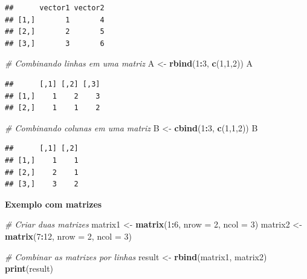 \documentclass[
]{book}
\newenvironment{Shaded}{\begin{snugshade}}{\end{snugshade}}
\newcommand{\AttributeTok}[1]{\textcolor[rgb]{0.13,0.29,0.53}{#1}}
\newcommand{\CommentTok}[1]{\textcolor[rgb]{0.56,0.35,0.01}{\textit{#1}}}
\newcommand{\DecValTok}[1]{\textcolor[rgb]{0.00,0.00,0.81}{#1}}
\newcommand{\FunctionTok}[1]{\textcolor[rgb]{0.13,0.29,0.53}{\textbf{#1}}}
\newcommand{\NormalTok}[1]{#1}
\newcommand{\OtherTok}[1]{\textcolor[rgb]{0.56,0.35,0.01}{#1}}
\newcommand{\SpecialCharTok}[1]{\textcolor[rgb]{0.81,0.36,0.00}{\textbf{#1}}}
\begin{document}
\begin{verbatim}
##      vector1 vector2
## [1,]       1       4
## [2,]       2       5
## [3,]       3       6
\end{verbatim}

\begin{Shaded}
\begin{Highlighting}[]
\CommentTok{\# Combinando linhas em uma matriz}
\NormalTok{A }\OtherTok{\textless{}{-}} \FunctionTok{rbind}\NormalTok{(}\DecValTok{1}\SpecialCharTok{:}\DecValTok{3}\NormalTok{, }\FunctionTok{c}\NormalTok{(}\DecValTok{1}\NormalTok{,}\DecValTok{1}\NormalTok{,}\DecValTok{2}\NormalTok{))}
\NormalTok{A}
\end{Highlighting}
\end{Shaded}

\begin{verbatim}
##      [,1] [,2] [,3]
## [1,]    1    2    3
## [2,]    1    1    2
\end{verbatim}

\begin{Shaded}
\begin{Highlighting}[]
\CommentTok{\# Combinando colunas em uma matriz}
\NormalTok{B }\OtherTok{\textless{}{-}} \FunctionTok{cbind}\NormalTok{(}\DecValTok{1}\SpecialCharTok{:}\DecValTok{3}\NormalTok{, }\FunctionTok{c}\NormalTok{(}\DecValTok{1}\NormalTok{,}\DecValTok{1}\NormalTok{,}\DecValTok{2}\NormalTok{))}
\NormalTok{B}
\end{Highlighting}
\end{Shaded}

\begin{verbatim}
##      [,1] [,2]
## [1,]    1    1
## [2,]    2    1
## [3,]    3    2
\end{verbatim}

\textbf{Exemplo com matrizes}

\begin{Shaded}
\begin{Highlighting}[]
\CommentTok{\# Criar duas matrizes}
\NormalTok{matrix1 }\OtherTok{\textless{}{-}} \FunctionTok{matrix}\NormalTok{(}\DecValTok{1}\SpecialCharTok{:}\DecValTok{6}\NormalTok{, }\AttributeTok{nrow =} \DecValTok{2}\NormalTok{, }\AttributeTok{ncol =} \DecValTok{3}\NormalTok{)}
\NormalTok{matrix2 }\OtherTok{\textless{}{-}} \FunctionTok{matrix}\NormalTok{(}\DecValTok{7}\SpecialCharTok{:}\DecValTok{12}\NormalTok{, }\AttributeTok{nrow =} \DecValTok{2}\NormalTok{, }\AttributeTok{ncol =} \DecValTok{3}\NormalTok{)}

\CommentTok{\# Combinar as matrizes por linhas}
\NormalTok{result }\OtherTok{\textless{}{-}} \FunctionTok{rbind}\NormalTok{(matrix1, matrix2)}
\FunctionTok{print}\NormalTok{(result)}
\end{Highlighting}
\end{Shaded}
\end{document}
